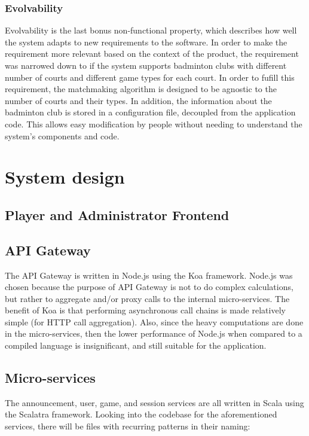 \documentclass{article}
\begin{document}
\subsubsection{Evolvability}
Evolvability is the last bonus non-functional property, which describes how well the system adapts to new requirements to the software. In order to make the requirement more relevant based on the context of the product, the requirement was narrowed down to if the system supports badminton clubs with different number of courts and different game types for each court. In order to fufill this requirement, the matchmaking algorithm is designed to be agnostic to the number of courts and their types. In addition, the information about the badminton club is stored in a configuration file, decoupled from the application code. This allows easy modification by people without needing to understand the system's components and code.

\section{System design}

\subsection{Player and Administrator Frontend}

\subsection{API Gateway}
The API Gateway is written in Node.js using the Koa framework. Node.js was chosen because the purpose of API Gateway is not to do complex calculations, but rather to aggregate and/or proxy calls to the internal micro-services. The benefit of Koa is that performing asynchronous call chains is made relatively simple (for HTTP call aggregation). Also, since the heavy computations are done in the micro-services, then the lower performance of Node.js when compared to a compiled language is insignificant, and still suitable for the application.

\subsection{Micro-services}
The announcement, user, game, and session services are all written in Scala using the Scalatra framework. Looking into the codebase for the aforementioned services, there will be files with recurring patterns in their naming:
\end{document}
